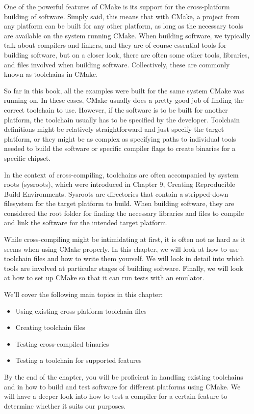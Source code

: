 One of the powerful features of CMake is its support for the cross-platform building of software. Simply said, this means that with CMake, a project from any platform can be built for any other platform, as long as the necessary tools are available on the system running CMake. When building software, we typically talk about compilers and linkers, and they are of course essential tools for building software, but on a closer look, there are often some other tools, libraries, and files involved when building software. Collectively, these are commonly known as toolchains in CMake.

So far in this book, all the examples were built for the same system CMake was running on. In these cases, CMake usually does a pretty good job of finding the correct toolchain to use. However, if the software is to be built for another platform, the toolchain usually has to be specified by the developer. Toolchain definitions might be relatively straightforward and just specify the target platform, or they might be as complex as specifying paths to individual tools needed to build the software or specific compiler flags to create binaries for a specific chipset.

In the context of cross-compiling, toolchains are often accompanied by system roots (sysroots), which were introduced in Chapter 9, Creating Reproducible Build Environments. Sysroots are directories that contain a stripped-down filesystem for the target platform to build. When building software, they are considered the root folder for finding the necessary libraries and files to compile and link the software for the intended target platform.

While cross-compiling might be intimidating at first, it is often not as hard as it seems when using CMake properly. In this chapter, we will look at how to use toolchain files and how to write them yourself. We will look in detail into which tools are involved at particular stages of building software. Finally, we will look at how to set up CMake so that it can run tests with an emulator.

We'll cover the following main topics in this chapter:

\begin{itemize}
\item 
Using existing cross-platform toolchain files

\item 
Creating toolchain files

\item 
Testing cross-compiled binaries

\item 
Testing a toolchain for supported features
\end{itemize}

By the end of the chapter, you will be proficient in handling existing toolchains and in how to build and test software for different platforms using CMake. We will have a deeper look into how to test a compiler for a certain feature to determine whether it suits our purposes.
















